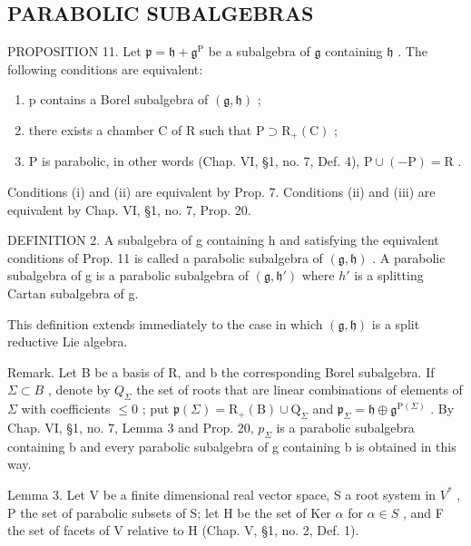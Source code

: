 \subsection{PARABOLIC SUBALGEBRAS}

PROPOSITION 11. Let \(\mathfrak{p} = \mathfrak{h} + \mathfrak{g}^{\mathrm{P}}\) be a subalgebra of \(\mathfrak{g}\) containing \(\mathfrak{h}\) . The following conditions are equivalent:

\begin{enumerate}
\def\labelenumi{(\roman{enumi})}
\item
  p contains a Borel subalgebra of \((\mathfrak{g}, \mathfrak{h})\) ;
\item
  there exists a chamber C of R such that \(\mathrm{P} \supset \mathrm{R}_{+}(\mathrm{C})\) ;
\item
  P is parabolic, in other words (Chap. VI, §1, no. 7, Def. 4), \(\mathrm{P} \cup (-\mathrm{P}) = \mathrm{R}\) .
\end{enumerate}

Conditions (i) and (ii) are equivalent by Prop. 7. Conditions (ii) and (iii) are equivalent by Chap. VI, §1, no. 7, Prop. 20.

DEFINITION 2. A subalgebra of g containing h and satisfying the equivalent conditions of Prop. 11 is called a parabolic subalgebra of \((\mathfrak{g}, \mathfrak{h})\) . A parabolic subalgebra of g is a parabolic subalgebra of \((\mathfrak{g}, \mathfrak{h}')\) where \(h'\) is a splitting Cartan subalgebra of g.

This definition extends immediately to the case in which \((\mathfrak{g}, \mathfrak{h})\) is a split reductive Lie algebra.

Remark. Let B be a basis of R, and b the corresponding Borel subalgebra. If \(\Sigma \subset B\) , denote by \(Q_{\Sigma}\) the set of roots that are linear combinations of elements of \(\Sigma\) with coefficients \(\leq 0\) ; put \(\mathfrak{p}(\Sigma) = \mathrm{R}_{+}(\mathrm{B}) \cup \mathrm{Q}_{\Sigma}\) and \(\mathfrak{p}_{\Sigma} = \mathfrak{h} \oplus \mathfrak{g}^{\mathrm{P}(\Sigma)}\) . By Chap. VI, §1, no. 7, Lemma 3 and Prop. 20, \(p_{\Sigma}\) is a parabolic subalgebra containing b and every parabolic subalgebra of g containing b is obtained in this way.

Lemma 3. Let V be a finite dimensional real vector space, S a root system in \(V^{*}\) , P the set of parabolic subsets of S; let H be the set of Ker \(\alpha\) for \(\alpha \in S\) , and F the set of facets of V relative to H (Chap. V, §1, no. 2, Def. 1).

